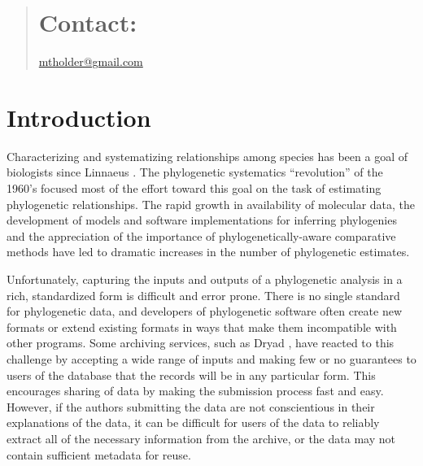 \documentclass{bioinfo}
\begin{document}
\begin{abstract}
\section{Contact:} \href{mailto:mtholder@gmail.com}{mtholder@gmail.com}

\end{abstract}

\section{Introduction}

Characterizing and systematizing relationships among species has been a goal of biologists since Linnaeus \cite{Linne1758}.
The phylogenetic systematics ``revolution'' of the 1960's focused most of the effort toward this goal on the 
    task of estimating phylogenetic relationships.
The rapid growth in availability of molecular data, the development of models and software implementations for
    inferring phylogenies and the appreciation of the importance of phylogenetically-aware comparative methods
    \citep[e.g.][]{Felsenstein1985Comp} have led to dramatic increases
    in the number of phylogenetic estimates.


Unfortunately, capturing the inputs and outputs of a phylogenetic analysis in a rich, standardized form is
 difficult and error prone. There is no single standard for phylogenetic data, and developers of phylogenetic software often create new formats or extend existing formats in ways that make them incompatible with other programs.
Some archiving services, such as Dryad \citep{Dryad}, have reacted to this challenge by accepting a 
    wide range of inputs and making few or no
    guarantees to users of the database that the records will be in any particular form.
This encourages sharing of data by making the submission process fast and easy. %
However, if the authors submitting the data are not conscientious in their explanations of the data, it can be difficult
    for users of the data to reliably extract all of the necessary information from the archive, or the data may not contain sufficient metadata for reuse.
\end{document}

